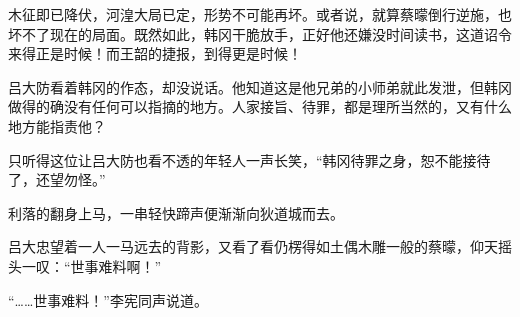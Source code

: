 木征即已降伏，河湟大局已定，形势不可能再坏。或者说，就算蔡曚倒行逆施，也坏不了现在的局面。既然如此，韩冈干脆放手，正好他还嫌没时间读书，这道诏令来得正是时候！而王韶的捷报，到得更是时候！

吕大防看着韩冈的作态，却没说话。他知道这是他兄弟的小师弟就此发泄，但韩冈做得的确没有任何可以指摘的地方。人家接旨、待罪，都是理所当然的，又有什么地方能指责他？

只听得这位让吕大防也看不透的年轻人一声长笑，“韩冈待罪之身，恕不能接待了，还望勿怪。”

利落的翻身上马，一串轻快蹄声便渐渐向狄道城而去。

吕大忠望着一人一马远去的背影，又看了看仍楞得如土偶木雕一般的蔡曚，仰天摇头一叹：“世事难料啊！”

“……世事难料！”李宪同声说道。

